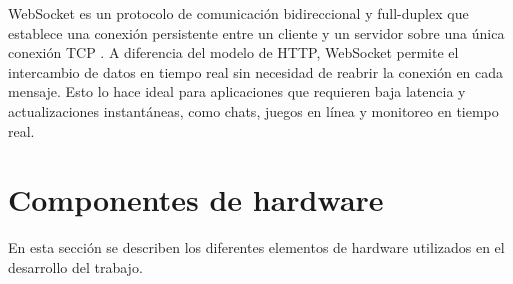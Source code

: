 WebSocket es un protocolo de comunicación bidireccional y full-duplex que
establece una conexión persistente entre un cliente y un servidor sobre una
única conexión TCP \cite{RFC6455}. A diferencia del modelo de HTTP, WebSocket
permite el intercambio de datos en tiempo real sin necesidad de reabrir la
conexión en cada mensaje. Esto lo hace ideal para aplicaciones que requieren
baja latencia y actualizaciones instantáneas, como chats, juegos en línea y
monitoreo en tiempo real.


\section{Componentes de hardware}\label{sec:hardware}

En esta sección se describen los diferentes elementos de hardware utilizados en
el desarrollo del trabajo. %


